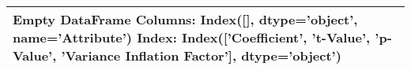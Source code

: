 \begin{tabular}{l}
\toprule
Empty DataFrame
Columns: Index([], dtype='object', name='Attribute')
Index: Index(['Coefficient', 't-Value', 'p-Value', 'Variance Inflation Factor'], dtype='object') \\
\bottomrule
\end{tabular}
